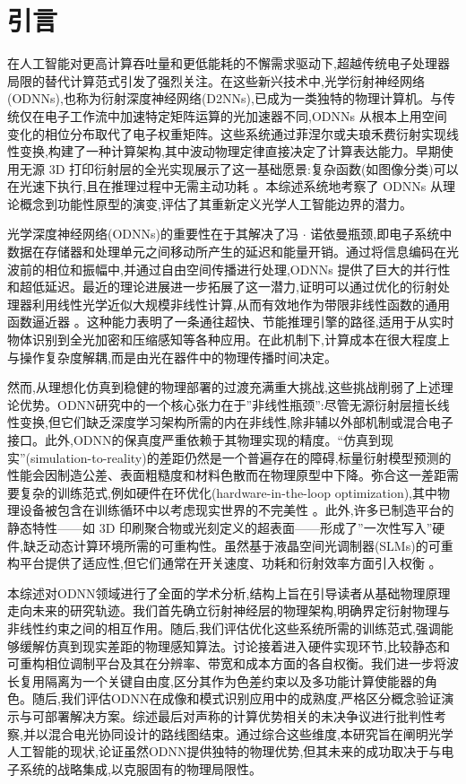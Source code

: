 \section{引言}\label{ux5f15ux8a00}

在人工智能对更高计算吞吐量和更低能耗的不懈需求驱动下,超越传统电子处理器局限的替代计算范式引发了强烈关注。在这些新兴技术中,光学衍射神经网络(ODNNs),也称为衍射深度神经网络(D2NNs),已成为一类独特的物理计算机。与传统仅在电子工作流中加速特定矩阵运算的光加速器不同,ODNNs 从根本上用空间变化的相位分布取代了电子权重矩阵。这些系统通过菲涅尔或夫琅禾费衍射实现线性变换,构建了一种计算架构,其中波动物理定律直接决定了计算表达能力。早期使用无源 3D 打印衍射层的全光实现展示了这一基础愿景:复杂函数(如图像分类)可以在光速下执行,且在推理过程中无需主动功耗 \citep{doi_10_1126_science_aat8084_e055772d}。本综述系统地考察了 ODNNs 从理论概念到功能性原型的演变,评估了其重新定义光学人工智能边界的潜力。

光学深度神经网络(ODNNs)的重要性在于其解决了冯 \(\cdot\) 诺依曼瓶颈,即电子系统中数据在存储器和处理单元之间移动所产生的延迟和能量开销。通过将信息编码在光波前的相位和振幅中,并通过自由空间传播进行处理,ODNNs 提供了巨大的并行性和超低延迟。最近的理论进展进一步拓展了这一潜力,证明可以通过优化的衍射处理器利用线性光学近似大规模非线性计算,从而有效地作为带限非线性函数的通用函数逼近器 \citep{doi_10_1186_s43593_025_00113_w_ca9e8e1e}。这种能力表明了一条通往超快、节能推理引擎的路径,适用于从实时物体识别到全光加密和压缩感知等各种应用。在此机制下,计算成本在很大程度上与操作复杂度解耦,而是由光在器件中的物理传播时间决定。

然而,从理想化仿真到稳健的物理部署的过渡充满重大挑战,这些挑战削弱了上述理论优势。ODNN研究中的一个核心张力在于''非线性瓶颈'':尽管无源衍射层擅长线性变换,但它们缺乏深度学习架构所需的内在非线性,除非辅以外部机制或混合电子接口。此外,ODNN的保真度严重依赖于其物理实现的精度。``仿真到现实''(simulation-to-reality)的差距仍然是一个普遍存在的障碍,标量衍射模型预测的性能会因制造公差、表面粗糙度和材料色散而在物理原型中下降。弥合这一差距需要复杂的训练范式,例如硬件在环优化(hardware-in-the-loop optimization),其中物理设备被包含在训练循环中以考虑现实世界的不完美性 \citep{doi_10_1117_12_3013482_d44587c1}。此外,许多已制造平台的静态特性------如 3D 印刷聚合物或光刻定义的超表面------形成了''一次性写入''硬件,缺乏动态计算环境所需的可重构性。虽然基于液晶空间光调制器(SLMs)的可重构平台提供了适应性,但它们通常在开关速度、功耗和衍射效率方面引入权衡 \citep{doi_10_1002_adom_202300561_c4d7a5b0}。

本综述对ODNN领域进行了全面的学术分析,结构上旨在引导读者从基础物理原理走向未来的研究轨迹。我们首先确立衍射神经层的物理架构,明确界定衍射物理与非线性约束之间的相互作用。随后,我们评估优化这些系统所需的训练范式,强调能够缓解仿真到现实差距的物理感知算法。讨论接着进入硬件实现环节,比较静态和可重构相位调制平台及其在分辨率、带宽和成本方面的各自权衡。我们进一步将波长复用隔离为一个关键自由度,区分其作为色差约束以及多功能计算使能器的角色。随后,我们评估ODNN在成像和模式识别应用中的成熟度,严格区分概念验证演示与可部署解决方案。综述最后对声称的计算优势相关的未决争议进行批判性考察,并以混合电光协同设计的路线图结束。通过综合这些维度,本研究旨在阐明光学人工智能的现状,论证虽然ODNN提供独特的物理优势,但其未来的成功取决于与电子系统的战略集成,以克服固有的物理局限性。

